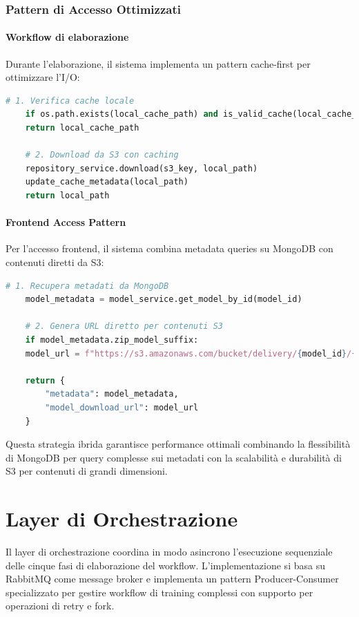 \subsubsection{Pattern di Accesso Ottimizzati}

\paragraph{Workflow di elaborazione}
Durante l'elaborazione, il sistema implementa un pattern cache-first per ottimizzare l'I/O:

\begin{lstlisting}[language=python, caption=Pattern cache-first per dati S3]
	# 1. Verifica cache locale
	if os.path.exists(local_cache_path) and is_valid_cache(local_cache_path):
	return local_cache_path
	
	# 2. Download da S3 con caching
	repository_service.download(s3_key, local_path)
	update_cache_metadata(local_path)
	return local_path
\end{lstlisting}
\newpage
\paragraph{Frontend Access Pattern}
Per l'accesso frontend, il sistema combina metadata queries su MongoDB con contenuti diretti da S3:

\begin{lstlisting}[language=python, caption=Pattern accesso ibrido frontend]
	# 1. Recupera metadati da MongoDB
	model_metadata = model_service.get_model_by_id(model_id)
	
	# 2. Genera URL diretto per contenuti S3
	if model_metadata.zip_model_suffix:
	model_url = f"https://s3.amazonaws.com/bucket/delivery/{model_id}/{model_metadata.zip_model_suffix}"
	
	return {
		"metadata": model_metadata,
		"model_download_url": model_url
	}
\end{lstlisting}

Questa strategia ibrida garantisce performance ottimali combinando la flessibilità di MongoDB per query complesse sui metadati con la scalabilità e durabilità di S3 per contenuti di grandi dimensioni.

\section{Layer di Orchestrazione}
Il layer di orchestrazione coordina in modo asincrono l'esecuzione sequenziale delle cinque fasi di elaborazione del workflow. L'implementazione si basa su RabbitMQ come message broker e implementa un pattern Producer-Consumer specializzato per gestire workflow di training complessi con supporto per operazioni di retry e fork.

